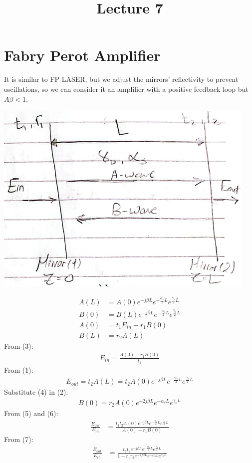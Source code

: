 \documentclass[11pt]{article}
\title{Lecture 7}
\author{}
\date{}
\begin{document}
\maketitle

\section{Fabry Perot Amplifier}
It is similar to FP LASER, but we adjust the mirrors' reflectivity to prevent oscillations, so we can consider it an amplifier with a positive feedback loop but $A \beta < 1$.

\begin{center}
    \includegraphics[scale=0.9]{1.png}
\end{center}
\begin{align}
    A(L) &= A(0) e^{-j \beta L} e^{-\frac{\alpha_s}{2} L} e^{\frac{\gamma_o}{2} L} \\
    B(0) &= B(L) e^{-j \beta L} e^{-\frac{\alpha_s}{2} L} e^{\frac{\gamma_o}{2} L} \\
    A(0) &= t_1 E_{in} + r_1 B(0) \\
    B(L) &= r_2 A(L)
\end{align}
From (3):
\begin{align}
    E_{in} = \frac{A(0) - r_1 B(0)}{t_1}
\end{align}
From (1):
\begin{align}
    E_{out} = t_2 A(L) = t_2 A(0) e^{-j \beta L} e^{-\frac{\alpha_s}{2} L} e^{\frac{\gamma_o}{2} L}
\end{align}
Substitute (4) in (2):
\begin{align}
    B(0) = r_2 A(0) e^{-2j \beta L} e^{-\alpha_s L} e^{\gamma_o L}
\end{align}
From (5) and (6):
\begin{align*}
    \frac{E_{out}}{E_{in}} &= \frac{t_1 t_2 A(0) e^{-j \beta L} e^{-\frac{\alpha_s}{2} L} e^{\frac{\gamma_o}{2} L}}{A(0) - r_1 B(0)}
\end{align*}
From (7):
\begin{align*}
    \frac{E_{out}}{E_{in}} &= \frac{t_1 t_2 e^{-j \beta L} e^{-\frac{\alpha_s}{2} L} e^{\frac{\gamma_o}{2} L}}{1 - r_1 r_2 e^{-2j \beta L} e^{-\alpha_s L} e^{\gamma_o L}}
\end{align*}
\end{document}
